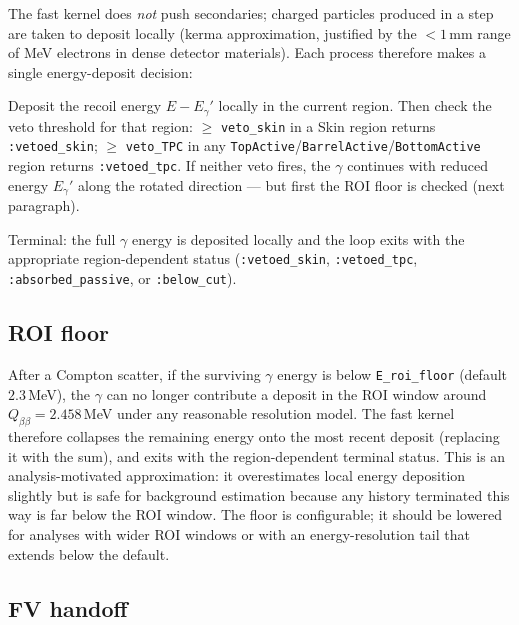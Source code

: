\documentclass[11pt]{article}
\begin{document}
The fast kernel does \emph{not} push secondaries; charged particles produced
in a step are taken to deposit locally (kerma approximation, justified by
the $<\!1$\,mm range of MeV electrons in dense detector materials). Each
process therefore makes a single energy-deposit decision:

\begin{description}[leftmargin=2.0cm,style=nextline]
\item[Compton.] Deposit the recoil energy $E - E_\gamma'$ locally in the
current region. Then check the veto threshold for that region:
$\geq$ \texttt{veto\_skin} in a Skin region returns
\texttt{:vetoed\_skin}; $\geq$ \texttt{veto\_TPC} in any
\texttt{TopActive}/\texttt{BarrelActive}/\texttt{BottomActive} region
returns \texttt{:vetoed\_tpc}. If neither veto fires, the $\gamma$ continues
with reduced energy $E_\gamma'$ along the rotated direction --- but first
the ROI floor is checked (next paragraph).
\item[Photoelectric / Pair.] Terminal: the full $\gamma$ energy is deposited
locally and the loop exits with the appropriate region-dependent status
(\texttt{:vetoed\_skin}, \texttt{:vetoed\_tpc},
\texttt{:absorbed\_passive}, or \texttt{:below\_cut}).
\end{description}

\subsection{ROI floor}
\label{sec:fastkernel-roifloor}

After a Compton scatter, if the surviving $\gamma$ energy is below
\texttt{E\_roi\_floor} (default $2.3$\,MeV), the $\gamma$ can no longer
contribute a deposit in the ROI window around $Q_{\beta\beta} = 2.458$\,MeV
under any reasonable resolution model. The fast kernel therefore collapses
the remaining energy onto the most recent deposit (replacing it with the
sum), and exits with the region-dependent terminal status. This is an
analysis-motivated approximation: it overestimates local energy deposition
slightly but is safe for background estimation because any history
terminated this way is far below the ROI window. The floor is configurable;
it should be lowered for analyses with wider ROI windows or with an
energy-resolution tail that extends below the default.

\subsection{FV handoff}
\label{sec:fastkernel-handoff}
\end{document}
